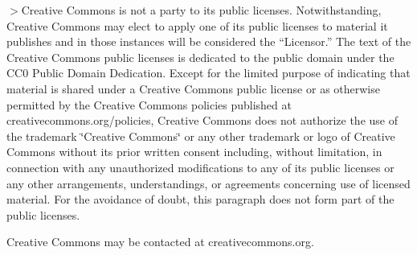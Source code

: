 $>$Creative Commons is not a party to its public licenses. Notwithstanding, Creative Commons may elect to apply one of its public licenses to material it publishes and in those instances will be considered the “\+Licensor.\+” The text of the Creative Commons public licenses is dedicated to the public domain under the C\+C0 Public Domain Dedication. Except for the limited purpose of indicating that material is shared under a Creative Commons public license or as otherwise permitted by the Creative Commons policies published at creativecommons.\+org/policies, Creative Commons does not authorize the use of the trademark \char`\"{}\+Creative Commons\char`\"{} or any other trademark or logo of Creative Commons without its prior written consent including, without limitation, in connection with any unauthorized modifications to any of its public licenses or any other arrangements, understandings, or agreements concerning use of licensed material. For the avoidance of doubt, this paragraph does not form part of the public licenses.

Creative Commons may be contacted at creativecommons.\+org. 